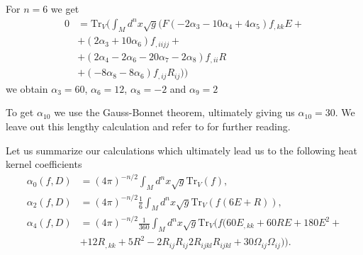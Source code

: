 For $n=6$ we get
\begin{align}
    0 &= \text{Tr}_V(\int_Md^nx\sqrt{g}
    (F(-2\alpha_3-10\alpha_4+4\alpha_5)f_{,kk}E +\nonumber\\
    &+(2\alpha_3 + 10\alpha_6)f_{,iijj}+\nonumber\\
    &+(2\alpha_4 -2\alpha_6 - 20\alpha_7 -2\alpha_8)f_{,ii}R\nonumber\\
    &+(-8\alpha_8 -8\alpha_6)f_{,ij}R_{ij}))
\end{align}
we obtain $\alpha_3 = 60$, $\alpha_6=12$, $\alpha_8 = -2$ and $\alpha_9 = 2$

To get $\alpha_{10}$ we use the Gauss-Bonnet theorem, ultimately giving us
$\alpha_{10}=30$. We leave out this lengthy calculation and refer to
\cite{heatkernel} for further reading.

Let us summarize our calculations which ultimately lead us to the following heat kernel
coefficients
\begin{align}
    \alpha_0(f, D) &= (4\pi)^{-n/2}\int_M d^n x \sqrt{g} \text{Tr}_V(f),\\
    \alpha_2(f, D) &= (4\pi)^{-n/2}\frac{1}{6}\int_M d^n x \sqrt{g}
    \text{Tr}_V(f(6E+R)),\\
    \alpha_4(f, D) &= (4\pi)^{-n/2}\frac{1}{360}\int_M d^n x \sqrt{g}
    \text{Tr}_V(f(60E_{,kk}+60RE+ 180E^2 +\\
    &+12R_{,kk} + 5R^2 - 2 R_{ij}R_{ij}
    2R_{ijkl}R_{ijkl} +30\Omega_{ij}\Omega_{ij})).
\end{align}


